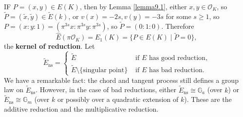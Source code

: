\documentclass{article}
\theoremstyle{definition}
\begin{document}
IF $P=(x,y) \in E(K)$, then by Lemma \ref{lemma9.1}, either $x, y \in \mathcal{O}_K$, so $\widetilde{P}=(\widetilde{x},\widetilde{y}) \in \widetilde{E}(k)$, or $v(x)=-2s,v(y)=-3s$ for some $s\ge 1$, so $P=(x:y:1) = (\pi^{3s}x : \pi^{3s}y : \pi^{3s})$, so $\widetilde{P} = (0:1:0)$. Therefore \[
\widehat{E}(\pi \mathcal{O}_K) = E_1(K) = \{P \in E(K) \mid  \widetilde{P} = 0\},
\]
the \textbf{kernel of reduction}. Let \[
\widetilde{E}_{\text{ns}} = \begin{cases}
    \widetilde{E} & \text{ if }E \text{ has good reduction,}\\
    \widetilde{E}\setminus \{\text{singular point}\} & \text{ if }E \text{ has bad reduction.}
\end{cases}
\]
We have a remarkable fact: the chord and tangent process still defines a group law on $\widetilde{E}_{\text{ns}}$. However, in the case of bad reductions, either $\widetilde{E}_{\text{ns}} \cong \mathbb{G}_a$ (over $k$) or $\widetilde{E}_{\text{ns}} \cong \mathbb{G}_m$ (over $k$ or possibly over a quadratic extension of $k$). These are the additive reduction and the multiplicative reduction.
\vspace{1mm}
 
\end{document}
